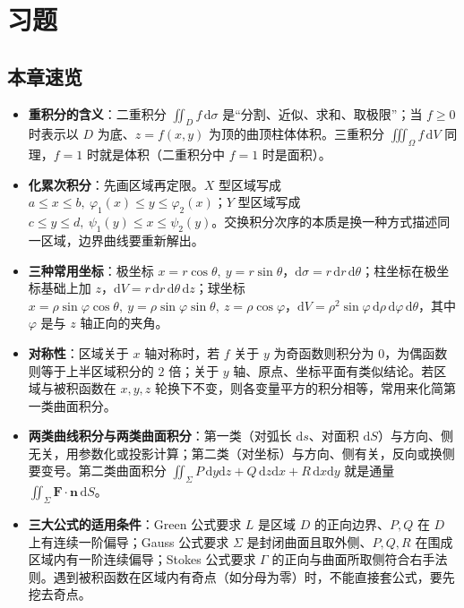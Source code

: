 \section{习题}

\subsection{本章速览}

\begin{itemize}
  \item \textbf{重积分的含义}：二重积分 $\iint_D f\,\mathrm{d}\sigma$ 是“分割、近似、求和、取极限”；当 $f\ge0$ 时表示以 $D$ 为底、$z=f(x,y)$ 为顶的曲顶柱体体积。三重积分 $\iiint_\Omega f\,\mathrm{d}V$ 同理，$f=1$ 时就是体积（二重积分中 $f=1$ 时是面积）。
  \item \textbf{化累次积分}：先画区域再定限。$X$ 型区域写成 $a\le x\le b,\ \varphi_1(x)\le y\le\varphi_2(x)$；$Y$ 型区域写成 $c\le y\le d,\ \psi_1(y)\le x\le\psi_2(y)$。交换积分次序的本质是换一种方式描述同一区域，边界曲线要重新解出。
  \item \textbf{三种常用坐标}：极坐标 $x=r\cos\theta,\ y=r\sin\theta$，$\mathrm{d}\sigma=r\,\mathrm{d}r\,\mathrm{d}\theta$；柱坐标在极坐标基础上加 $z$，$\mathrm{d}V=r\,\mathrm{d}r\,\mathrm{d}\theta\,\mathrm{d}z$；球坐标 $x=\rho\sin\varphi\cos\theta,\ y=\rho\sin\varphi\sin\theta,\ z=\rho\cos\varphi$，$\mathrm{d}V=\rho^2\sin\varphi\,\mathrm{d}\rho\,\mathrm{d}\varphi\,\mathrm{d}\theta$，其中 $\varphi$ 是与 $z$ 轴正向的夹角。
  \item \textbf{对称性}：区域关于 $x$ 轴对称时，若 $f$ 关于 $y$ 为奇函数则积分为 $0$，为偶函数则等于上半区域积分的 $2$ 倍；关于 $y$ 轴、原点、坐标平面有类似结论。若区域与被积函数在 $x,y,z$ 轮换下不变，则各变量平方的积分相等，常用来化简第一类曲面积分。
  \item \textbf{两类曲线积分与两类曲面积分}：第一类（对弧长 $\mathrm{d}s$、对面积 $\mathrm{d}S$）与方向、侧无关，用参数化或投影计算；第二类（对坐标）与方向、侧有关，反向或换侧要变号。第二类曲面积分 $\iint_\Sigma P\,\mathrm{d}y\mathrm{d}z+Q\,\mathrm{d}z\mathrm{d}x+R\,\mathrm{d}x\mathrm{d}y$ 就是通量 $\iint_\Sigma \mathbf F\cdot\mathbf n\,\mathrm{d}S$。
  \item \textbf{三大公式的适用条件}：Green 公式要求 $L$ 是区域 $D$ 的正向边界、$P,Q$ 在 $D$ 上有连续一阶偏导；Gauss 公式要求 $\Sigma$ 是封闭曲面且取外侧、$P,Q,R$ 在围成区域内有一阶连续偏导；Stokes 公式要求 $\Gamma$ 的正向与曲面所取侧符合右手法则。遇到被积函数在区域内有奇点（如分母为零）时，不能直接套公式，要先挖去奇点。
\end{itemize}

